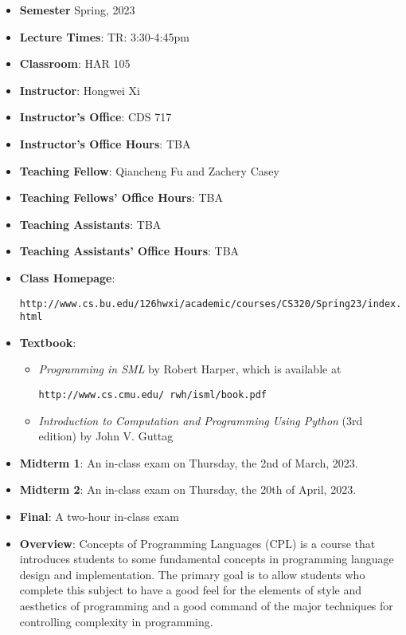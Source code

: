 \documentclass[11pt]{article}
\begin{document}
\begin{itemize}
\item {\bf Semester} Spring, 2023

\item {\bf Lecture Times}: TR: 3:30-4:45pm

\item {\bf Classroom}: HAR 105

\item {\bf Instructor}: Hongwei Xi
\item {\bf Instructor's Office}: CDS 717
\item {\bf Instructor's Office Hours}: TBA

\item {\bf Teaching Fellow}: Qiancheng Fu and Zachery Casey 
\item {\bf Teaching Fellows' Office Hours}: TBA

\item {\bf Teaching Assistants}: TBA
\item {\bf Teaching Assistants' Office Hours}: TBA

\item {\bf Class Homepage}:\\
\centerline{%
\texttt{http://www.cs.bu.edu/\char126hwxi/academic/courses/CS320/Spring23/index.html}%
}%

\item {\bf Textbook}:\kern6pt
\begin{itemize}
\item
{\em Programming in SML} by Robert Harper, which is available at
\begin{center}
\texttt{http://www.cs.cmu.edu/~rwh/isml/book.pdf}
\end{center}
\item
{\em Introduction to Computation and Programming Using Python} (3rd edition) by John V. Guttag
\end{itemize}

\item
{\bf Midterm 1}\kern6pt:
An in-class exam on Thursday, the 2nd of March, 2023.

\item
{\bf Midterm 2}\kern6pt:
An in-class exam on Thursday, the 20th of April, 2023.

\item {\bf Final}:\kern6pt A two-hour in-class exam

\item {\bf Overview}:
Concepts of Programming Languages (CPL) is a course that introduces
students to some fundamental concepts in programming language design and
implementation. The primary goal is to allow students who complete this
subject to have a good feel for the elements of style and aesthetics of
programming and a good command of the major techniques for controlling
complexity in programming.


\end{itemize}
\end{document}

